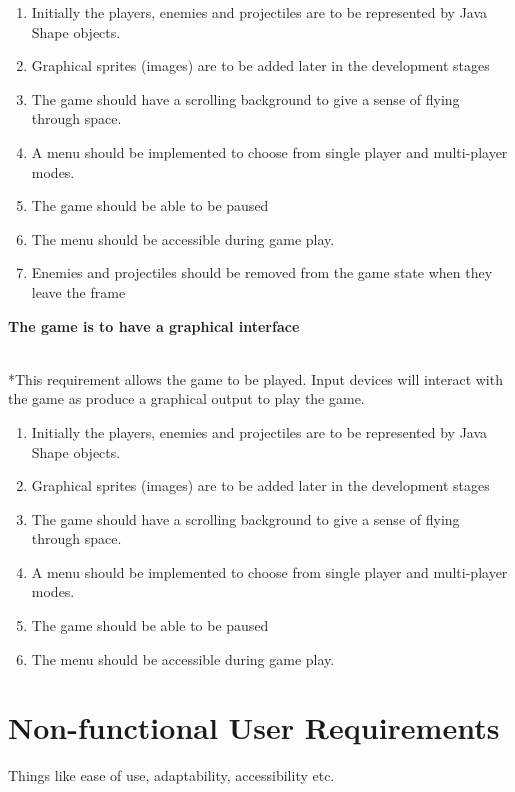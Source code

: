 \begin{enumerate}
\begin{enumerate}
\item Initially the players, enemies and projectiles are to be represented by Java Shape objects.
\item Graphical sprites (images) are to be added later in the development stages
\item The game should have a scrolling background to give a sense of flying through space.
\item A menu should be implemented to choose from single player and multi-player modes.
\item The game should be able to be paused
\item The menu should be accessible during game play.
\item Enemies and projectiles should be removed from the game state when they leave the frame
\end{enumerate}

\large{ \item \textbf{The game is to have a graphical interface}}
\\*This requirement allows the game to be played. Input devices will interact with the game as produce a graphical output to play the game.

\begin{enumerate}
\item Initially the players, enemies and projectiles are to be represented by Java Shape objects.
\item Graphical sprites (images) are to be added later in the development stages
\item The game should have a scrolling background to give a sense of flying through space.
\item A menu should be implemented to choose from single player and multi-player modes.
\item The game should be able to be paused
\item The menu should be accessible during game play.
\end{enumerate}

\end{enumerate}


\section{Non-functional User Requirements}
\label{sec: non-functional}

Things like ease of use, adaptability, accessibility etc.

